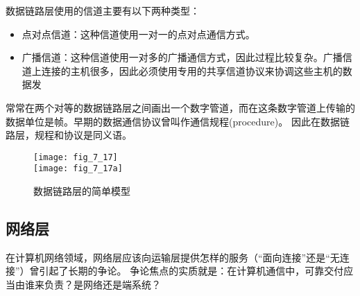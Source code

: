 数据链路层使用的信道主要有以下两种类型：
\begin{itemize}
  \item 点对点信道：这种信道使用一对一的点对点通信方式。

  \item 广播信道：这种信道使用一对多的广播通信方式，因此过程比较复杂。广播信道上连接的主机很多，因此必须使用专用的共享信道协议来协调这些主机的数据发

\end{itemize}


常常在两个对等的数据链路层之间画出一个数字管道，而在这条数字管道上传输的数据单位是帧。早期的数据通信协议曾叫作通信规程(procedure)。 因此在数据链路层，规程和协议是同义语。





\begin{figure}
  \centering
  \texttt{[image: fig\_7\_17]}\\
  \texttt{[image: fig\_7\_17a]}\\
  \caption{数据链路层的简单模型 }\label{fig_7_17}
\end{figure}



\subsection{网络层}

在计算机网络领域，网络层应该向运输层提供怎样的服务（“面向连接”还是“无连接”）曾引起了长期的争论。
争论焦点的实质就是：在计算机通信中，可靠交付应当由谁来负责？是网络还是端系统？

